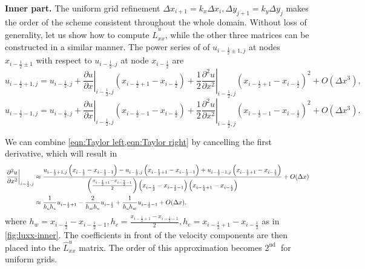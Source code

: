 \documentclass{article}
\begin{document}
\textbf{Inner part.}
The uniform grid refinement $\Delta x_{i+1}=k_x\Delta x_i,\Delta y_{j+1}=k_y\Delta y_j$ makes the order of the scheme consistent throughout the whole domain. Without loss of generality, let us show how to compute $\hat{L}^u_{xx}$, while the other three matrices can be constructed in a similar manner. The power series of of $u_{i-\frac{1}{2}\pm 1,j}$ at nodes $x_{i - \frac{1}{2}\pm 1}$ with respect to $u_{i - \frac{1}{2},j}$ at node $x_{i-\frac{1}{2}}$ are
\begin{equation}\label{eqn:Taylor right} 
	u_{i-\frac{1}{2}+1,j}=u_{i-\frac{1}{2},j}+\left.\frac{\partial u}{\partial x}\right|_{i-\frac{1}{2},j}\left(x_{i-\frac{1}{2}+1}-x_{i-\frac{1}{2}}\right)+\frac{1}{2}\left.\frac{\partial^2 u}{\partial x^2}\right|_{i-\frac{1}{2},j}\left(x_{i-\frac{1}{2}+1}-x_{i-\frac{1}{2}}\right)^2+O\left(\Delta x^3\right),
\end{equation}
\begin{equation}\label{eqn:Taylor left} 
	u_{i-\frac{1}{2}-1,j}=u_{i-\frac{1}{2},j}+\left.\frac{\partial u}{\partial x}\right|_{i-\frac{1}{2},j}\left(x_{i-\frac{1}{2}-1}-x_{i-\frac{1}{2}}\right)+\frac{1}{2}\left.\frac{\partial^2 u}{\partial x^2}\right|_{i-\frac{1}{2},j}\left(x_{i-\frac{1}{2}-1}-x_{i-\frac{1}{2}}\right)^2+O\left(\Delta x^3\right).
\end{equation}

We can combine \cref{eqn:Taylor left,eqn:Taylor right} by cancelling the first derivative, which will result in
\begin{align}\label{eqn:laplacian-discretization-non-uniform-dx}
\left.\frac{\partial^2 u}{\partial x^2}\right|_{i-\frac{1}{2},j} & \approx \frac{u_{i-\frac{1}{2}+1,j}\left(x_{i-\frac{1}{2}}-x_{i-\frac{1}{2}-1}\right)-u_{i-\frac{1}{2},j}\left(x_{i-\frac{1}{2}+1}-x_{i-\frac{1}{2}-1}\right)+u_{i-\frac{1}{2}-1,j}\left(x_{i-\frac{1}{2}+1}-x_{i-\frac{1}{2}}\right)}{\left(\frac{x_{i-\frac{1}{2}+1}-x_{i-\frac{1}{2}-1}}{2}\right)\left(x_{i-\frac{1}{2}}-x_{i-\frac{1}{2}-1}\right)\left(x_{i-\frac{1}{2}+1}-x_{i-\frac{1}{2}}\right)}+O(\Delta x)\notag\\
& \approx \frac{1}{h_c h_e}u_{i-\frac{1}{2}+1} - \frac{2}{h_w h_e}u_{i-\frac{1}{2}} + \frac{1}{h_c h_w}u_{i-\frac{1}{2}-1} + O(\Delta x).
\end{align}
where $h_w=x_{i-\frac{1}{2}}-x_{i-\frac{1}{2}-1},h_c = \frac{x_{i-\frac{1}{2}+1}-x_{i-\frac{1}{2}-1}}{2}, h_e = x_{i-\frac{1}{2}+1}-x_{i-\frac{1}{2}}$ as in \cref{fig:luxx-inner}. The coefficients in front of the velocity components are then placed into the $\hat{L}^u_{xx}$ matrix. The order of this approximation becomes $2^{\text {nd }}$ for uniform grids. 
\end{document}
